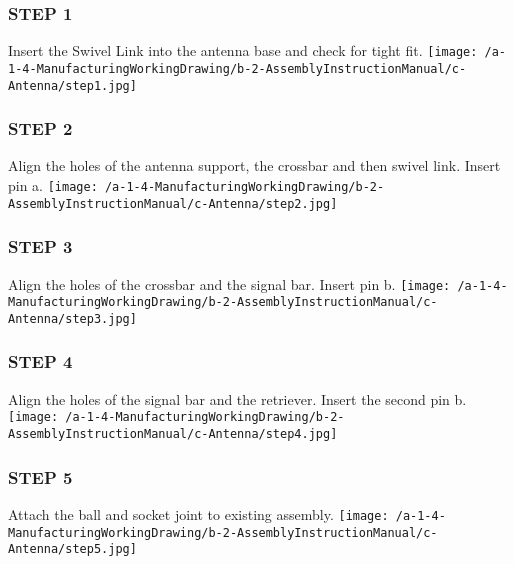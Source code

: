 \clearpage
\subsubsection{STEP 1}
\begin{center}
Insert the Swivel Link into the antenna base and check for tight fit.
\texttt{[image: /a-1-4-ManufacturingWorkingDrawing/b-2-AssemblyInstructionManual/c-Antenna/step1.jpg]}
\end{center}
\newline
\subsubsection{STEP 2}
\begin{center}
Align the holes of the antenna support, the crossbar and then swivel link. Insert pin a.
\texttt{[image: /a-1-4-ManufacturingWorkingDrawing/b-2-AssemblyInstructionManual/c-Antenna/step2.jpg]}
\end{center}
\newline
\subsubsection{STEP 3}
\begin{center}
Align the holes of the crossbar and the signal bar. Insert pin b.
\texttt{[image: /a-1-4-ManufacturingWorkingDrawing/b-2-AssemblyInstructionManual/c-Antenna/step3.jpg]}
\end{center}
\newline
\subsubsection{STEP 4}
\begin{center}
Align the holes of the signal bar and the retriever. Insert the second pin b.
\texttt{[image: /a-1-4-ManufacturingWorkingDrawing/b-2-AssemblyInstructionManual/c-Antenna/step4.jpg]}
\end{center}
\newline
\subsubsection{STEP 5}
\begin{center}
Attach the ball and socket joint to existing assembly.
\texttt{[image: /a-1-4-ManufacturingWorkingDrawing/b-2-AssemblyInstructionManual/c-Antenna/step5.jpg]}
\end{center}
\clearpage

